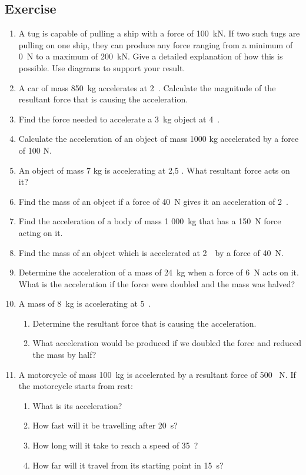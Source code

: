 
\subsection{Exercise}
\begin{enumerate}
\item{A tug is capable of pulling a ship with a force of 100~kN. If two such tugs are pulling on one ship, they can produce any force ranging from a minimum of 0~N to a maximum of 200~kN. Give a detailed explanation of how this is possible. Use diagrams to support your result.}
\item{A car of mass 850~kg accelerates at 2~\mss. Calculate the magnitude of the resultant force that is causing the acceleration.}
\item{Find the force needed to accelerate a 3~kg object at 4~\mss.}
\item{Calculate the acceleration of an object of mass 1000 kg accelerated by a force of 100 N.}
\item{An object of mass 7 kg is accelerating at 2,5 \mss. What resultant force acts on it?}
\item{Find the mass of an object if a force of 40~N gives it an acceleration of 2~\mss.}
\item{Find the acceleration of a body of mass 1 000~kg that has a 150~N force acting on it.}
\item{Find the mass of an object which is accelerated at 2~\mss\ by a force of 40~N.}
\item{Determine the acceleration of a mass of 24~kg when a force of 6~N acts on it. What is the acceleration if the force were doubled and the mass was halved?}
\item{A mass of 8~kg is accelerating at 5~\mss.
\begin{enumerate}
\item{Determine the resultant force that is causing the acceleration.}
\item{What acceleration would be produced if we doubled the force and reduced the mass by half?}
\end{enumerate}}
\item{A motorcycle of mass 100~kg is accelerated by a resultant force of 500 ~N. If the motorcycle starts from rest:
\begin{enumerate}
\item{What is its acceleration?}
\item{How fast will it be travelling after 20~s?}
\item{How long will it take to reach a speed of 35~\ms?}
\item{How far will it travel from its starting point in 15~s?}
\end{enumerate}}


\end{enumerate}
